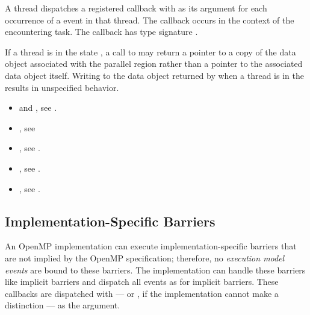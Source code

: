 A thread dispatches a registered  callback with 
 as its  argument for each occurrence 
of a  event in that thread. The callback occurs in the 
context of the encountering task. The callback has type signature
. 

\restrictions

If a thread is in the state , 
a call to  may return a pointer to a copy of the 
data object associated with the parallel region rather than a pointer to 
the associated data object itself. Writing to the data object 
returned by  when a thread is in the 
 results in unspecified behavior.

\crossreferences
\begin{itemize}

\item {} and , see
  .

\item {}, see

\item {}, see
  .

\item {}, see
  .

\item {}, see
  .
\end{itemize}



\subsection{Implementation-Specific Barriers}
\label{subsec:implementation-specific-barrier}

An OpenMP implementation can execute implementation-specific barriers 
that are not implied by the OpenMP specification; therefore, no 
\emph{execution model events} are bound to these barriers. The 
implementation can handle these barriers like implicit barriers and
dispatch all events as for implicit barriers. These callbacks 
are dispatched with  --- or
, if the implementation cannot make a
distinction --- as the  argument.



